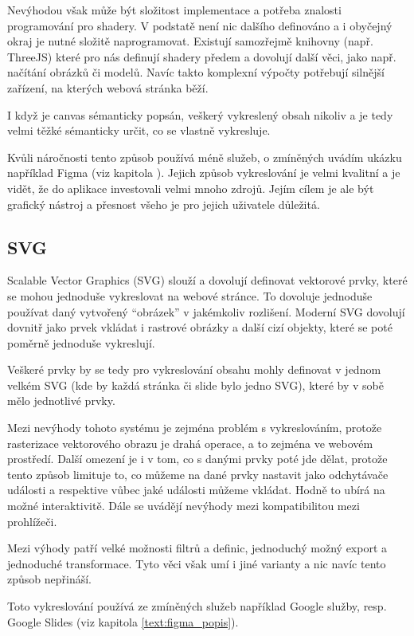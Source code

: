 Nevýhodou však může být složitost implementace a potřeba znalosti programování pro shadery.
V podstatě není nic dalšího definováno a i obyčejný okraj je nutné složitě naprogramovat.
Existují samozřejmě knihovny (např. ThreeJS) které pro nás definují shadery předem a dovolují další věci, jako např. načítání obrázků či modelů.
Navíc takto komplexní výpočty potřebují silnější zařízení, na kterých webová stránka běží.

I když je canvas sémanticky popsán, veškerý vykreslený obsah nikoliv a je tedy velmi těžké sémanticky určit, co se vlastně vykresluje.

Kvůli náročnosti tento způsob používá méně služeb, o zmíněných uvádím ukázku například Figma (viz kapitola \label{text:figma_popis}).
Jejich způsob vykreslování je velmi kvalitní a je vidět, že do aplikace investovali velmi mnoho zdrojů.
Jejím cílem je ale být grafický nástroj a přesnost všeho je pro jejich uživatele důležitá.

\subsection{SVG}

Scalable Vector Graphics (SVG) slouží a dovolují definovat vektorové prvky, které se mohou jednoduše vykreslovat na webové stránce.
To dovoluje jednoduše používat daný vytvořený \enquote{obrázek} v jakémkoliv rozlišení.
Moderní SVG dovolují dovnitř jako prvek vkládat i rastrové obrázky a další cizí objekty, které se poté poměrně jednoduše vykreslují.

Veškeré prvky by se tedy pro vykreslování obsahu mohly definovat v jednom velkém SVG (kde by každá stránka či slide bylo jedno SVG), které by v sobě mělo jednotlivé prvky.

Mezi nevýhody tohoto systému je zejména problém s vykreslováním, protože rasterizace vektorového obrazu je drahá operace, a to zejména ve webovém prostředí.
Další omezení je i v tom, co s danými prvky poté jde dělat, protože tento způsob limituje to, co můžeme na dané prvky nastavit jako odchytávače události a respektive vůbec jaké události můžeme vkládat.
Hodně to ubírá na možné interaktivitě.
Dále se uvádějí nevýhody mezi kompatibilitou mezi prohlížeči.

Mezi výhody patří velké možnosti filtrů a definic, jednoduchý možný export a jednoduché transformace.
Tyto věci však umí i jiné varianty a nic navíc tento způsob nepřináší.

Toto vykreslování používá ze zmíněných služeb například Google služby, resp. Google Slides (viz kapitola \ref{text:figma_popis}).

